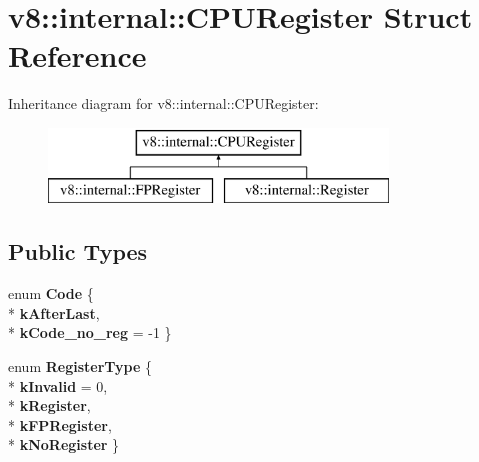 \hypertarget{structv8_1_1internal_1_1_c_p_u_register}{}\section{v8\+:\+:internal\+:\+:C\+P\+U\+Register Struct Reference}
\label{structv8_1_1internal_1_1_c_p_u_register}
Inheritance diagram for v8\+:\+:internal\+:\+:C\+P\+U\+Register\+:\begin{figure}[H]
\begin{center}
\leavevmode
\includegraphics[height=2.000000cm]{structv8_1_1internal_1_1_c_p_u_register}
\end{center}
\end{figure}
\subsection*{Public Types}
\begin{DoxyCompactItemize}
\item 
enum {\bfseries Code} \{ \\*
{\bfseries k\+After\+Last}, 
\\*
{\bfseries k\+Code\+\_\+no\+\_\+reg} = -\/1
 \}\hypertarget{structv8_1_1internal_1_1_c_p_u_register_a7435af8c519849173779c7cd3d38ad00}{}\label{structv8_1_1internal_1_1_c_p_u_register_a7435af8c519849173779c7cd3d38ad00}

\item 
enum {\bfseries Register\+Type} \{ \\*
{\bfseries k\+Invalid} = 0, 
\\*
{\bfseries k\+Register}, 
\\*
{\bfseries k\+F\+P\+Register}, 
\\*
{\bfseries k\+No\+Register}
 \}\hypertarget{structv8_1_1internal_1_1_c_p_u_register_a3f3673d49114631e793e2991cd765054}{}\label{structv8_1_1internal_1_1_c_p_u_register_a3f3673d49114631e793e2991cd765054}

\end{DoxyCompactItemize}
